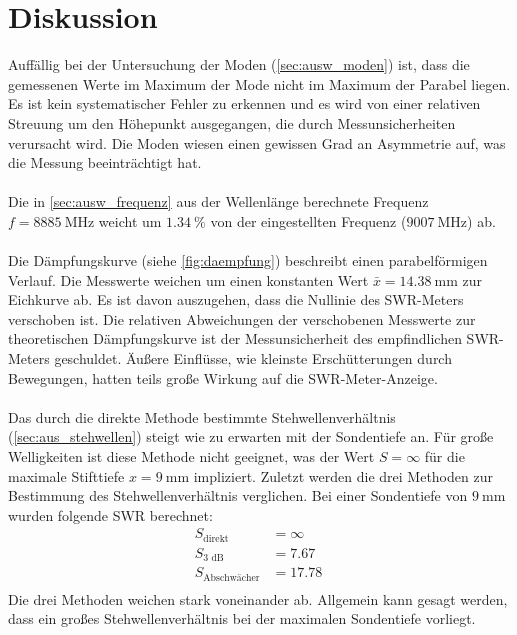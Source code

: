 \section{Diskussion}
\label{sec:Diskussion}
Auffällig bei der Untersuchung der Moden (\autoref{sec:ausw_moden}) ist, dass die gemessenen Werte im Maximum der Mode nicht im Maximum der Parabel liegen.
Es ist kein systematischer Fehler zu erkennen und es wird von einer relativen Streuung um den Höhepunkt ausgegangen, die durch Messunsicherheiten verursacht wird.
Die Moden wiesen einen gewissen Grad an Asymmetrie auf, was die Messung beeinträchtigt hat.
\\
\\
Die in \autoref{sec:ausw_frequenz} aus der Wellenlänge berechnete Frequenz $f = \SI{8885}{\mega\hertz}$ weicht um $\SI{1.34}{\percent}$ von der eingestellten Frequenz ($\SI{9007}{\mega\hertz}$) ab.
\\
\\
Die Dämpfungskurve (siehe \autoref{fig:daempfung}) beschreibt einen parabelförmigen Verlauf.
Die Messwerte weichen um einen konstanten Wert $\bar{x} = \SI{14.38}{\milli\metre}$ zur Eichkurve ab.
Es ist davon auszugehen, dass die Nullinie des SWR-Meters verschoben ist.
Die relativen Abweichungen der verschobenen Messwerte zur theoretischen Dämpfungskurve ist der Messunsicherheit des empfindlichen SWR-Meters geschuldet.
Äußere Einflüsse, wie kleinste Erschütterungen durch Bewegungen, hatten teils große Wirkung auf die SWR-Meter-Anzeige.
\\
\\
Das durch die direkte Methode bestimmte Stehwellenverhältnis (\autoref{sec:aus_stehwellen}) steigt wie zu erwarten mit der Sondentiefe an.
Für große Welligkeiten ist diese Methode nicht geeignet, was der Wert $S = \infty$ für die maximale Stifttiefe $x = \SI{9}{\milli\metre}$ impliziert.
Zuletzt werden die drei Methoden zur Bestimmung des Stehwellenverhältnis verglichen.
Bei einer Sondentiefe von $\SI{9}{\milli\metre}$ wurden folgende SWR berechnet:
\begin{align*}
    S_\text{direkt} &= \infty \\
    S_\text{3 dB} &= \SI{7.67}{} \\
    S_\text{Abschwächer} &= \SI{17.78}{} \\
\end{align*}
Die drei Methoden weichen stark voneinander ab.
Allgemein kann gesagt werden, dass ein großes Stehwellenverhältnis bei der maximalen Sondentiefe vorliegt.